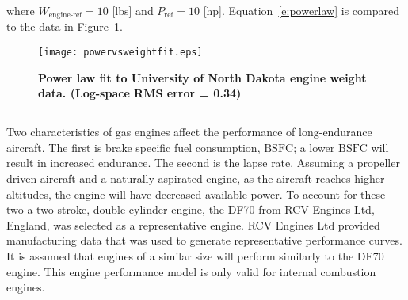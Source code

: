 where $W_{\text{engine-ref}} = 10$ [lbs] and $P_{\text{ref}} = 10$ [hp].   
Equation~\eqref{e:powerlaw} \DIFdelbegin {}%
\DIFdelend is compared to the data in Figure~\ref{f:powervsweightfit}.

\begin{figure}[H]
	\begin{center}
	\DIFdelbeginFL %
\DIFdelendFL \DIFaddbeginFL \texttt{[image: powervsweightfit.eps]}
    \DIFaddendFL \caption{\textbf{Power law fit to University of North Dakota engine weight data\cite{gasengine}. (Log-space RMS error = 0.34)}}
	\label{f:powervsweightfit}
	\end{center}
\end{figure}

\DIFdelbegin \subsection{}
\addtocounter{subsection}{-1}%
\DIFdelend \DIFaddbegin \subsubsection{}
\DIFaddend 

Two characteristics of gas engines affect the performance of long-endurance aircraft.  
The first is brake specific fuel consumption, $\text{BSFC}$; a lower $\text{BSFC}$ will result in increased endurance.  
The second is the lapse rate.  
Assuming a propeller driven aircraft and a naturally aspirated engine, as the aircraft reaches higher altitudes, the engine will have decreased available power. 
To account for these two \DIFdelbegin {}\DIFdelend \DIFaddbegin {}\DIFaddend a two-stroke, double cylinder engine, the DF70 from RCV Engines Ltd, England, was selected as a representative engine.  
RCV Engines Ltd provided manufacturing data that was used to generate representative performance curves.\cite{rcvengines}
It is assumed that engines of a similar size will perform similarly to the DF70 engine.  
This engine performance model is only valid for internal combustion engines.

\DIFdelbegin \subsubsection{}
\addtocounter{subsubsection}{-1}%

